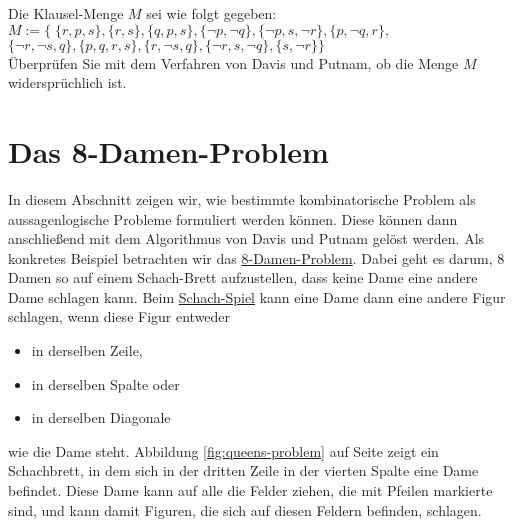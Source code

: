 \exercise
Die Klausel-Menge $M$ sei wie folgt gegeben: \\[0.2cm]
\hspace*{1.3cm} $M := \bigl\{ \; \{ r, p, s \},
                         \{r, s \}, \{ q, p, s \},
                         \{ \neg p,  \neg q\},
                         \{ \neg p, s,  \neg r\},
                         \{p,  \neg q, r \},$ \\[0.2cm]
\hspace*{2.6cm} $\{ \neg r,  \neg s, q\},
                         \{p, q, r, s \},
                         \{r,  \neg s, q\},
                         \{ \neg r,  s, \neg q\},
                         \{s, \neg r\} \bigr\}$ \\[0.2cm]
Überprüfen Sie mit dem Verfahren von Davis und Putnam, ob die Menge $M$ widersprüchlich ist.  
\eox


\section{Das 8-Damen-Problem}
In diesem Abschnitt zeigen wir, wie bestimmte kombinatorische Problem als aussagenlogische Probleme formuliert
werden können.  Diese können dann anschließend mit dem Algorithmus von Davis und Putnam gelöst werden.  Als
konkretes Beispiel betrachten wir das \href{https://en.wikipedia.org/wiki/Eight_queens_puzzle}{8-Damen-Problem}.  
Dabei geht es darum, 8 Damen so auf einem Schach-Brett aufzustellen, dass keine Dame eine andere Dame schlagen kann.
Beim \href{https://en.wikipedia.org/wiki/Chess}{Schach-Spiel} kann eine Dame dann eine andere Figur schlagen,
wenn diese Figur entweder 
\begin{itemize}
\item in derselben Zeile,
\item in derselben Spalte  oder
\item in derselben Diagonale
\end{itemize}
wie die Dame steht.  Abbildung \ref{fig:queens-problem} auf Seite \pageref{fig:queens-problem}
zeigt ein Schachbrett, in dem sich in der dritten Zeile in der vierten Spalte
eine Dame befindet.  Diese Dame kann auf alle die Felder ziehen, die mit Pfeilen markierte
sind, und kann damit Figuren, die sich auf diesen Feldern befinden, schlagen.

